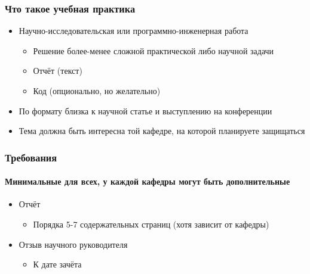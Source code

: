 \documentclass{../../slides-style}
\begin{document}
    
    \begin{frame}[plain]
        \titlepage
    \end{frame}

    \begin{frame}
        \frametitle{Что такое учебная практика}
        \begin{itemize}
            \item Научно-исследовательская или программно-инженерная работа%
            \begin{itemize}
                \item Решение более-менее сложной практической либо научной задачи
                \item Отчёт (текст)
                \item Код (опционально, но желательно)
            \end{itemize}
            \item По формату близка к научной статье и выступлению на конференции
            \item Тема должна быть интересна той кафедре, на которой планируете защищаться
        \end{itemize}
    \end{frame}

    \begin{frame}
        \frametitle{Требования}
        \framesubtitle{Минимальные для всех, у каждой кафедры могут быть дополнительные}
        \begin{itemize}
            \item Отчёт
            \begin{itemize}
                \item Порядка 5-7 содержательных страниц (хотя зависит от кафедры)
            \end{itemize}
            \item Отзыв научного руководителя
            \begin{itemize}
                \item К дате зачёта
            \end{itemize}
        \end{itemize}
    \end{frame}
\end{document}
